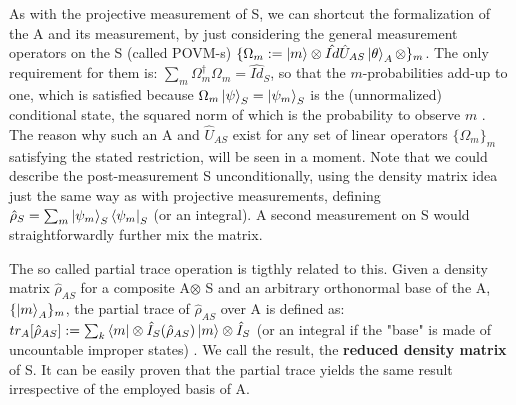 \documentclass[11pt, a4paper]{article} %
\begin{document}
As with the projective measurement of S, we can shortcut the formalization of the A and its measurement, by just considering the general measurement operators on the S (called POVM-s) $\{\Omega_m:=\ket{m}\otimes\hat{Id}\hat{U}_{AS}\ket{\theta}_A\otimes\}_m$. The only requirement for them is: $\sum_m \Omega_m^\dagger\Omega_m=\hat{Id}_S$, so that the $m$-probabilities add-up to one, which is satisfied because $\Omega_m\ket{\psi}_S=\ket{\psi_m}_S$ is the (unnormalized) conditional state, the squared norm of which is the probability to observe $m$ \cite{Generalized, Durr}. The reason why such an A and $\hat{U}_{AS}$  exist for any set of linear operators $\{\Omega_m\}_m$ satisfying the stated restriction, will be seen in a moment. Note that we could describe the post-measurement S unconditionally, using the density matrix idea just the same way as with projective measurements, defining $\hat{\rho}_S=\sum_m \ket{\psi_m}_S\bra{\psi_m}_S$ (or an integral). A second measurement on S would straightforwardly further mix the matrix.

The so called partial trace operation is tigthly related to this. Given a density matrix $\hat{\rho}_{AS}$ for a composite A$\otimes$ S and an arbitrary orthonormal base of the A, $\{\ket{m}_A\}_m$, the partial trace of $\hat{\rho}_{AS}$ over A is defined as: $tr_{A}[\hat{\rho}_{AS}] := \sum_k \bra{m}\otimes \hat{I}_S(\hat{\rho}_{AS})\ket{m}\otimes \hat{I}_S$ (or an integral if the "base" is made of uncountable improper states) \cite{Generalized, Durr}. We call the result, the {\bf reduced density matrix} of S. It can be easily proven that the partial trace yields the same result irrespective of the employed basis of A.
\end{document}
